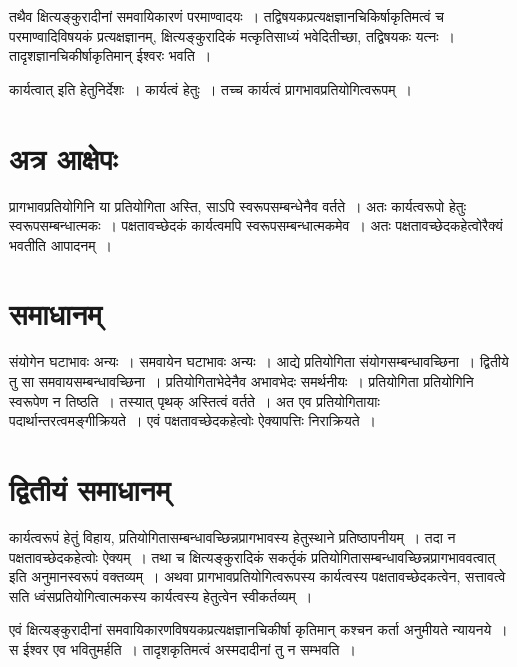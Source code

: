{तथैव क्षित्यङ्कुरादीनां समवायिकारणं परमाण्वादयः~। तद्विषयकप्रत्यक्षज्ञानचिकिर्षाकृतिमत्वं च परमाण्वादिविषयकं प्रत्यक्षज्ञानम्, क्षित्यङ्कुरादिकं मत्कृतिसाध्यं भवेदितीच्छा, तद्विषयकः यत्नः~। तादृशज्ञानचिकीर्षाकृतिमान् ईश्वरः भवति~। 

कार्यत्वात् इति हेतुनिर्देशः~। कार्यत्वं हेतुः~। तच्च कार्यत्वं प्रागभावप्रतियोगित्वरूपम्~। 

\section*{अत्र आक्षेपः} 

प्रागभावप्रतियोगिनि या प्रतियोगिता अस्ति, साऽपि स्वरूपसम्बन्धेनैव वर्तते~। अतः कार्यत्वरूपो हेतुः स्वरूपसम्बन्धात्मकः~। पक्षतावच्छेदकं कार्यत्वमपि स्वरूपसम्बन्धात्मकमेव~। अतः पक्षतावच्छेदकहेत्वोरैक्यं भवतीति आपादनम्~। 

\section*{समाधानम्} 

संयोगेन घटाभावः अन्यः~। समवायेन घटाभावः अन्यः~। आद्ये प्रतियोगिता संयोगसम्बन्धावच्छिना~। द्वितीये तु सा समवायसम्बन्धावच्छिना~। प्रतियोगिताभेदेनैव अभावभेदः समर्थनीयः~। प्रतियोगिता प्रतियोगिनि स्वरूपेण न तिष्ठति~। तस्यात् पृथक् अस्तित्वं वर्तते~। अत एव प्रतियोगितायाः पदार्थान्तरत्वमङ्गीक्रियते~। एवं पक्षतावच्छेदकहेत्वोः ऐक्यापत्तिः निराक्रियते~। 

\section*{द्वितीयं समाधानम्} 

कार्यत्वरूपं हेतुं विहाय, प्रतियोगितासम्बन्धावच्छिन्नप्रागभावस्य हेतुस्थाने प्रतिष्ठापनीयम्~। तदा न पक्षतावच्छेदकहेत्वोः ऐक्यम्~। तथा च क्षित्यङ्कुरादिकं सकर्तृकं प्रतियोगितासम्बन्धावच्छिन्नप्रागभाववत्वात् इति अनुमानस्वरूपं वक्तव्यम्~। अथवा प्रागभावप्रतियोगित्वरूपस्य कार्यत्वस्य पक्षतावच्छेदकत्वेन, सत्तावत्वे सति ध्वंसप्रतियोगित्वात्मकस्य कार्यत्वस्य हेतुत्वेन स्वीकर्तव्यम्~। 

एवं क्षित्यङ्कुरादीनां समवायिकारणविषयकप्रत्यक्षज्ञानचिकीर्षा कृतिमान् कश्चन कर्ता अनुमीयते न्यायनये~। स ईश्वर एव भवितुमर्हति~। तादृशकृतिमत्वं अस्मदादीनां तु न सम्भवति~। 

\articleend
}
